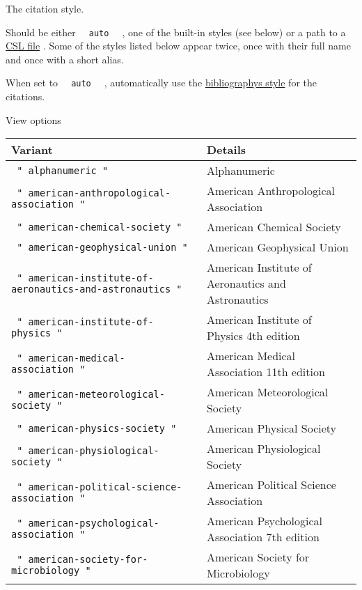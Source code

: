 The citation style.

Should be either \texttt{\ }{\texttt{\ auto\ }}\texttt{\ } , one of the
built-in styles (see below) or a path to a
\href{https://citationstyles.org/}{CSL file} . Some of the styles listed
below appear twice, once with their full name and once with a short
alias.

When set to \texttt{\ }{\texttt{\ auto\ }}\texttt{\ } , automatically
use the
\href{/docs/reference/model/bibliography/\#parameters-style}{bibliography\textquotesingle s
style} for the citations.


View options

\begin{longtable}[]{@{}ll@{}}
\toprule\noalign{}
Variant & Details \\
\midrule\noalign{}
\endhead
\bottomrule\noalign{}
\endlastfoot
\texttt{\ "\ alphanumeric\ "\ } & Alphanumeric \\
\texttt{\ "\ american-anthropological-association\ "\ } & American
Anthropological Association \\
\texttt{\ "\ american-chemical-society\ "\ } & American Chemical
Society \\
\texttt{\ "\ american-geophysical-union\ "\ } & American Geophysical
Union \\
\texttt{\ "\ american-institute-of-aeronautics-and-astronautics\ "\ } &
American Institute of Aeronautics and Astronautics \\
\texttt{\ "\ american-institute-of-physics\ "\ } & American Institute of
Physics 4th edition \\
\texttt{\ "\ american-medical-association\ "\ } & American Medical
Association 11th edition \\
\texttt{\ "\ american-meteorological-society\ "\ } & American
Meteorological Society \\
\texttt{\ "\ american-physics-society\ "\ } & American Physical
Society \\
\texttt{\ "\ american-physiological-society\ "\ } & American
Physiological Society \\
\texttt{\ "\ american-political-science-association\ "\ } & American
Political Science Association \\
\texttt{\ "\ american-psychological-association\ "\ } & American
Psychological Association 7th edition \\
\texttt{\ "\ american-society-for-microbiology\ "\ } & American Society
for Microbiology \\

\end{longtable}
